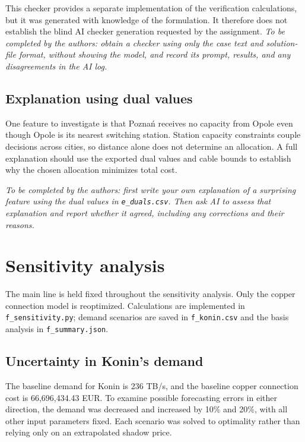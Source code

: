 \documentclass[11pt,a4paper]{article}
\begin{document}
This checker provides a separate implementation of the verification calculations, but it was generated with knowledge of the formulation. It therefore does not establish the blind AI checker generation requested by the assignment.
\textit{To be completed by the authors: obtain a checker using only the case text and solution-file format, without showing the model, and record its prompt, results, and any disagreements in the AI log.}

\subsection{Explanation using dual values}
One feature to investigate is that Poznań receives no capacity from Opole even though Opole is its nearest switching station. Station capacity constraints couple decisions across cities, so distance alone does not determine an allocation. A full explanation should use the exported dual values and cable bounds to establish why the chosen allocation minimizes total cost.

\textit{To be completed by the authors: first write your own explanation of a surprising feature using the dual values in \texttt{e\_duals.csv}. Then ask AI to assess that explanation and report whether it agreed, including any corrections and their reasons.}

\section{Sensitivity analysis}
\label{sec:sensitivity}
The main line is held fixed throughout the sensitivity analysis. Only the copper connection model is reoptimized. Calculations are implemented in \texttt{f\_sensitivity.py}; demand scenarios are saved in \texttt{f\_konin.csv} and the basis analysis in \texttt{f\_summary.json}.

\subsection{Uncertainty in Konin's demand}
The baseline demand for Konin is 236 TB/s, and the baseline copper connection cost is 66,696,434.43 EUR. To examine possible forecasting errors in either direction, the demand was decreased and increased by 10\% and 20\%, with all other input parameters fixed. Each scenario was solved to optimality rather than relying only on an extrapolated shadow price.
\end{document}
